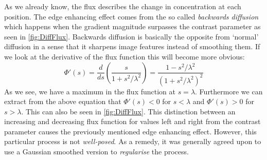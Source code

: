 As we already know, the flux describes the change in concentration at each position. The edge
enhancing effect comes from the so called \textit{backwards diffusion} which happens when the
gradient magnitude surpasses the contrast parameter as seen in \ref{fig:DiffFlux}. Backwards
diffusion is basically the opposite from `normal' diffusion in a sense that it sharpens image
features instead of smoothing them.
If we look at the derivative of the flux function this will become more obvious:
\begin{equation}
    \Phi'(s) = \frac{d}{ds} \left(\frac{s}{1 + s^2/\lambda^2}\right) = 
    \frac{1 - s^2/\lambda^2}{\left(1 + s^2/\lambda^2\right)^2}
\end{equation}
As we see, we have a maximum in the flux function at $s = \lambda$. Furthermore we can extract from
the above equation that $\Phi'(s) < 0$ for $s < \lambda$ and $\Phi'(s) > 0$ for $s > \lambda$. This
can also be seen in \ref{fig:DiffFlux}. This distinction between an increasing and decreasing flux
function for values left and right from the contrast parameter causes the previously mentioned
edge enhancing effect.
However, this particular process is not \textit{well-posed}\cite{weickert96}. As a remedy, it was
generally agreed upon to use a Gaussian smoothed version to \textit{regularise} the
process\cite{weickert96}.

